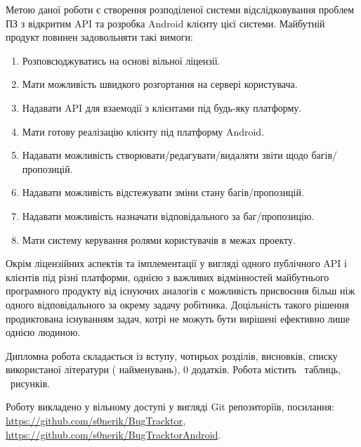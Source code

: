 \documentclass[../main.tex]{subfiles}
\begin{document}
Метою даної роботи є створення розподіленої системи відслідковування проблем ПЗ з відкритим API та розробка Android клієнту цієї системи. Майбутній продукт повинен задовольняти такі вимоги:
\begin{enumerate}
\item Розповсюджуватись на основі вільної ліцензії.
\item Мати можливість швидкого розгортання на сервері користувача.
\item Надавати API для взаемодії з клієнтами під будь-яку платформу.
\item Мати готову реалізацію клієнту під платформу Android.
\item Надавати можливість створювати/редагувати/видаляти звіти щодо багів/пропозицій.
\item Надавати можливість відстежувати зміни стану багів/пропозицій.
\item Надавати можливість назначати відповідального за баг/пропозицію.
\item Мати систему керування ролями користувачів в межах проекту.
\end{enumerate}

Окрім ліцензійних аспектів та імплементації у вигляді одного публічного API і клієнтів під різні платформи, однією з важливих відмінностей майбутнього програмного продукту від існуючих аналогів є можливість присвоєння більш ніж одного відповідального за окрему задачу робітника. Доцільність такого рішення продиктована існуванням задач, котрі не можуть бути вирішені ефективно лише однією людиною.

Дипломна робота складається із вступу, чотирьох розділів, висновків, списку використаної літератури ( найменувань), 0 додатків. Робота містить \totaltables\ таблиць, \totalfigures\  рисунків.

Роботу викладено у вільному доступі у вигляді Git репозиторіїв, посилання: \url{https://github.com/s0nerik/BugTracktor}, \url{https://github.com/s0nerik/BugTracktorAndroid}.
\end{document}
